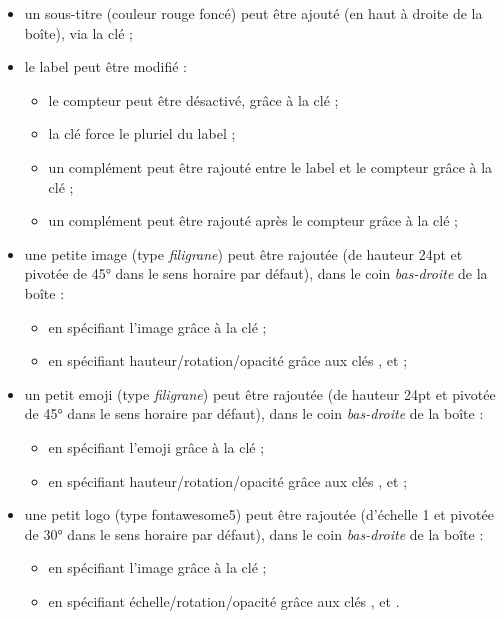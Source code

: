 \documentclass[french,11pt,a4paper]{article}
\begin{document}
\begin{itemize}
	\item un \textsf{sous-titre} (couleur \textsf{rouge foncé}) peut être ajouté (en haut à droite de la boîte), via la clé \MontreCode{[SousTitre=...]} ;
	\item le label peut être modifié :
	\begin{itemize}
		\item le compteur peut être désactivé, grâce à la clé \MontreCode{[Compteur=false]} ;
		\item la clé \MontreCode{[Pluriel]} force le pluriel du label ;
		\item un complément peut être rajouté entre le label et le compteur grâce à la clé \MontreCode{[ModifLabel=...]} ;
		\item un complément peut être rajouté après le compteur grâce à la clé \MontreCode{[ComplementTitre=...]} ;
	\end{itemize}
	\item une petite image (type \textit{filigrane}) peut être rajoutée (de hauteur 24pt et pivotée de 45° dans le sens horaire par défaut), dans le coin \textit{bas-droite} de la boîte :
	\begin{itemize}
		\item en spécifiant l'image grâce à la clé \MontreCode{[Logo=...]} ;
		\item en spécifiant hauteur/rotation/opacité grâce aux clés \MontreCode{[HauteurLogo=...]} , \MontreCode{[RotationLogo=...]} et \MontreCode{[OpaciteLogo=...]} ;
	\end{itemize}
	\item un petit emoji (type \textit{filigrane}) peut être rajoutée (de hauteur 24pt et pivotée de 45° dans le sens horaire par défaut), dans le coin \textit{bas-droite} de la boîte :
	\begin{itemize}
		\item en spécifiant l'emoji grâce à la clé \MontreCode{[Emoji=...]} ;
		\item en spécifiant hauteur/rotation/opacité grâce aux clés \MontreCode{[HauteurLogo=...]} , \MontreCode{[RotationLogo=...]} et \MontreCode{[OpaciteLogo=...]} ;
	\end{itemize}
	\item une petit logo (type \textsf{fontawesome5}) peut être rajoutée (d'échelle 1 et pivotée de 30° dans le sens horaire par défaut), dans le coin \textit{bas-droite} de la boîte :
	\begin{itemize}
		\item en spécifiant l'image grâce à la clé \MontreCode{[Icone=...]} ;
		\item en spécifiant échelle/rotation/opacité grâce aux clés \MontreCode{[EchelleIcone=...]} , \MontreCode{[RotationIcone=...]} et \MontreCode{[OpaciteIcone=...]}.
	\end{itemize}
\end{itemize}
\end{document}
